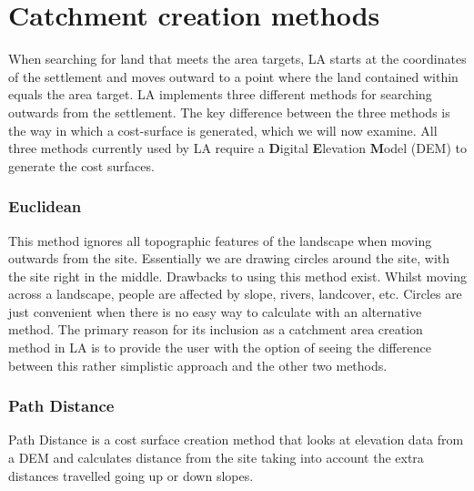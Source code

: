 \section{Catchment creation methods} 
  When searching for land that meets the area targets, LA starts at
  the coordinates of the settlement and moves outward to a point where the land
  contained within equals the area target.  LA implements three
  different methods for searching outwards from the settlement.  The key
  difference between the three methods is the way in which a cost-surface is
  generated, which we will now examine.  All three methods currently used by LA
  require a \textbf{D}igital \textbf{E}levation \textbf{M}odel (DEM) to generate
  the cost surfaces.
    \subsubsection{Euclidean} \label{subsubsection:Euclidean} 
      This method ignores all topographic features of the landscape when moving
      outwards from the site.  Essentially we are drawing circles around the site,
      with the site right in the middle.  Drawbacks to using this method exist.
      Whilst moving across a landscape, people are affected by slope, rivers,
      landcover, etc.  Circles are just convenient when there is no easy way to
      calculate with an alternative method.  The primary reason for its inclusion
      as a catchment area creation method in LA is to provide the user
      with the option of seeing the difference between this rather simplistic
      approach and the other two methods.
    \subsubsection{Path Distance}
      Path Distance is a cost surface creation method that looks at elevation data
      from a DEM and calculates distance from the site taking into account the
      extra distances travelled going up or down slopes.
